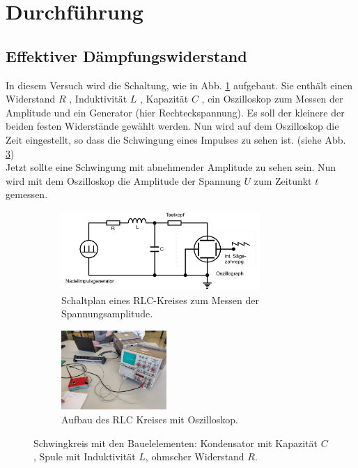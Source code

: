 \section{Durchführung}
\label{sec:Durchführung}
\subsection{Effektiver Dämpfungswiderstand}
\label{sec:a}
In diesem Versuch wird die Schaltung, wie in Abb. \ref{fig:schaltung_ampli} aufgebaut.
Sie enthält einen Widerstand $R$ , Induktivität $L$ , Kapazität $C$ , ein Oszilloskop zum Messen der Amplitude und ein Generator (hier Rechteckspannung).
Es soll der kleinere der beiden festen Widerstände gewählt werden.
Nun wird auf dem Oszilloskop die Zeit eingestellt, so dass die Schwingung eines Impulses zu sehen ist. (siehe Abb. \ref{fig:aufbau_ampli})\\
Jetzt sollte eine Schwingung mit abnehmender Amplitude zu sehen sein.
Nun wird mit dem Oszilloskop die Amplitude der Spannung $U$ zum Zeitunkt $t$ gemessen.
\begin{figure}
    \centering
    \begin{subfigure}{0.48\textwidth}
        \centering
        \includegraphics[height=3cm]{content/data/amplitude.jpg}
        \caption{Schaltplan eines RLC-Kreises zum Messen der Spannungsamplitude. \cite[S.294]{anleitung}}
        \label{fig:schaltung_ampli}
    \end{subfigure}
    \begin{subfigure}{0.48\textwidth}
        \centering
        \includegraphics[height=3cm]{content/data/aufbau.jpeg}
        \caption{Aufbau des RLC Kreises mit Oszilloskop.} 
        \label{fig:aufbau_ampli}
    \end{subfigure}
    \caption{Schwingkreis mit den Bauelelementen: Kondensator mit Kapazität $C$, Spule mit Induktivität $L$, ohmscher Widerstand $R$.}
\end{figure}

